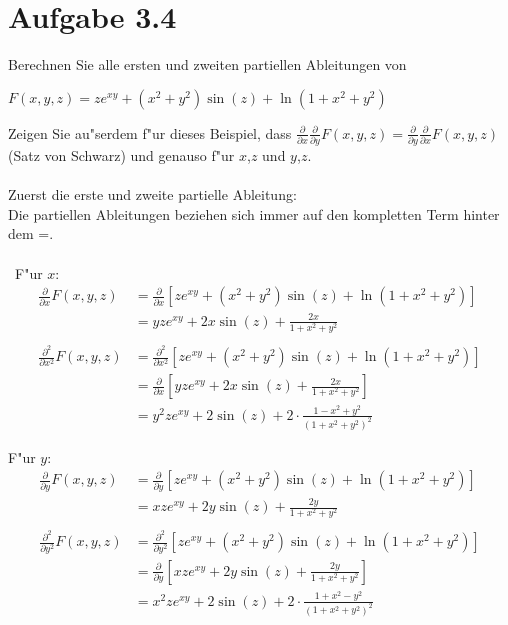 \documentclass{theozettel}
\begin{document}
\section*{Aufgabe 3.4}Berechnen Sie alle ersten und zweiten partiellen Ableitungen von
\begin{center}
$F\left(x,y,z\right)=ze^{xy}+\left(x^2+y^2\right)\sin\left(z\right)+\ln\left(1+x^2+y^2\right)$
\end{center}
Zeigen Sie au"serdem f"ur dieses Beispiel, dass $\frac{\partial}{\partial x}\frac{\partial}{\partial y}F\left(x,y,z\right) =\frac{\partial}{\partial y}\frac{\partial}{\partial x}F\left(x,y,z\right)$ (Satz von Schwarz) und genauso f"ur $x$,$z$ und $y$,$z$.\\\\
Zuerst die erste und zweite partielle Ableitung:\\
Die partiellen Ableitungen beziehen sich immer auf den kompletten Term hinter dem \glqq =\grqq.\\\\\
F"ur $x$:\\
\begin{align*}
\frac{\partial}{\partial x}F\left(x,y,z\right) &=\frac{\partial}{\partial x}\left[ze^{xy}+\left(x^2+y^2\right)\sin\left(z\right)+\ln\left(1+x^2+y^2\right)\right]\\
&=yze^{xy}+2x\sin\left(z\right)+\frac{2x}{1+x^2+y^2}\\\\
\frac{\partial^2}{\partial x^2}F\left(x,y,z\right) &=\frac{\partial^2}{\partial x^2}\left[ze^{xy}+\left(x^2+y^2\right)\sin\left(z\right)+\ln\left(1+x^2+y^2\right)\right]\\
&=\frac{\partial}{\partial x}\left[yze^{xy}+2x\sin\left(z\right)+\frac{2x}{1+x^2+y^2}\right]\\
&= y^2 z e^{xy}+2\sin\left(z\right) +2 \cdot\frac{1-x^2+y^2}{\left(1+x^2+y^2\right)^2}
\end{align*}

F"ur $y$:\\
\begin{align*}
\frac{\partial}{\partial y}F\left(x,y,z\right) &=\frac{\partial}{\partial y}\left[ze^{xy}+\left(x^2+y^2\right)\sin\left(z\right)+\ln\left(1+x^2+y^2\right)\right]\\
&=xze^{xy}+2y\sin\left(z\right)+\frac{2y}{1+x^2+y^2}\\\\
\frac{\partial^2}{\partial y^2}F\left(x,y,z\right) &=\frac{\partial^2}{\partial y^2}\left[ze^{xy}+\left(x^2+y^2\right)\sin\left(z\right)+\ln\left(1+x^2+y^2\right)\right]\\
&=\frac{\partial}{\partial y}\left[xze^{xy}+2y\sin\left(z\right)+\frac{2y}{1+x^2+y^2}\right]\\
&= x^2 z e^{xy}+2\sin\left(z\right) +2 \cdot\frac{1+x^2-y^2}{\left(1+x^2+y^2\right)^2}
\end{align*}
\end{document}
